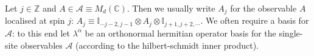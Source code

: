 \documentclass[prl,twocolumn,lengthcheck,superscriptaddress]{revtex4-1}
\theoremstyle{definition}
\theoremstyle{remark}
\begin{document}
Let $j\in\mathbb{Z}$ and $A\in \mathcal{A}\equiv M_d(\mathbb{C})$. Then we usually write $A_j$ for the observable $A$ localised at spin $j$: $A_j \equiv \mathbb{I}_{\cdots j-2, j-1}\otimes A_j\otimes \mathbb{I}_{j+1,j+2,\cdots}$. We often require a basis for $\mathcal{A}$: to this end let $\lambda^{\alpha}$ be an orthonormal hermitian operator basis for the single-site observables $\mathcal{A}$ (according to the hilbert-schmidt inner product).

\end{document}
